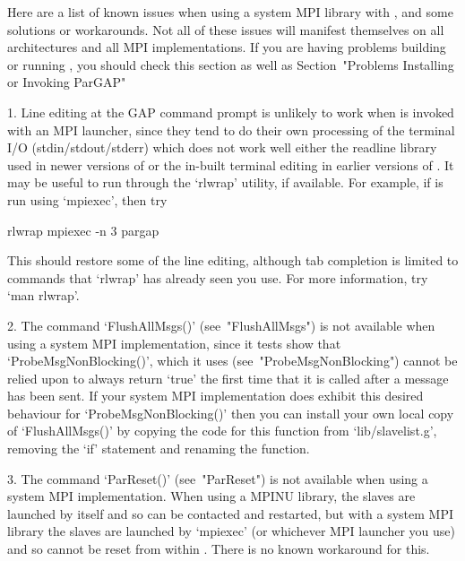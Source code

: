 \endlist



Here are a list of known issues when using a system MPI library with {\ParGAP}, 
and some solutions or workarounds. Not all of these issues will manifest 
themselves on all architectures and all MPI implementations. If you are having 
problems building or running {\ParGAP}, you should check this section as well as 
Section~"Problems Installing or Invoking ParGAP"

\beginlist
\item{1.}
  Line editing at the GAP command prompt is unlikely to work when {\ParGAP} is
  invoked with an MPI launcher, since they tend to do their own processing 
  of the terminal I/O (stdin/stdout/stderr) which does not work well 
  either the readline library used in newer versions of {\GAP} or the in-built
  terminal editing in earlier versions of {\GAP}. It may be useful to run
  {\ParGAP} through the `rlwrap' utility, if available. For example, if 
  {\ParGAP} is run using `mpiexec', then try

\begintt
rlwrap mpiexec -n 3 pargap
\endtt

\item{}
  This should restore some of the line editing, although tab completion is 
  limited to commands that `rlwrap' has already seen you use. For more 
  information, try `man rlwrap'.

\item{2.}
  The command `FlushAllMsgs()' (see~"FlushAllMsgs") is not available 
  when using a system MPI implementation, since it tests show that 
  `ProbeMsgNonBlocking()', which it uses (see~"ProbeMsgNonBlocking") cannot be 
  relied upon to always return `true' the first time that it is called after a
  message has been sent. If your system MPI implementation does exhibit this 
  desired behaviour for `ProbeMsgNonBlocking()' then you can install your own
  local copy of `FlushAllMsgs()' by copying the code for this function from 
  `lib/slavelist.g', removing the `if' statement and renaming the function.

\item{3.}
  The command `ParReset()' (see~"ParReset") is not available when using a
  system MPI implementation. When using a MPINU library, the slaves are launched
  by {\ParGAP} itself and so can be contacted and restarted, but with a system
  MPI library the slaves are launched by `mpiexec' (or whichever MPI launcher
  you use) and so cannot be reset from within {\ParGAP}. There is no known
  workaround for this.

